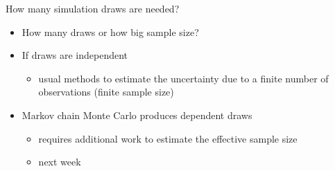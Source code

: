 \documentclass[english,t]{beamer}
\renewcommand{\emph}[1]{\textcolor{navyblue}{#1}}
\begin{document}
\begin{frame}{How many simulation draws are needed?}

  \begin{itemize}
  \item How many draws or how big sample size?
  \item If draws are independent
    \begin{itemize}
    \item usual methods to estimate the uncertainty due to a finite
      number of observations (finite sample size)
    \end{itemize}
  \item Markov chain Monte Carlo produces dependent draws
    \begin{itemize}
    \item requires additional work to estimate the \emph{effective
        sample size}
    \item next week
    \end{itemize}
  \end{itemize}

\end{frame}
\end{document}
